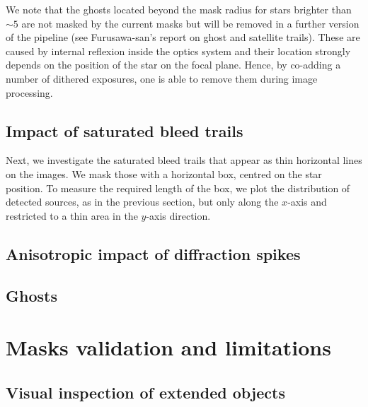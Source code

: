 \documentclass[11pt,a4paper,oneside,final]{scrartcl}
\begin{document}
We note that the ghosts located beyond the mask radius for stars brighter than $\sim5$ are not masked by the current masks but will be removed in a further version of the pipeline (see Furusawa-san's report on ghost and satellite trails). These are caused by internal reflexion inside the optics system and their location strongly depends on the position of the star on the focal plane. Hence, by co-adding a number of dithered exposures, one is able to remove them during image processing.


\subsection{Impact of saturated bleed trails}

Next, we investigate the saturated bleed trails that appear as thin horizontal lines on the images. We mask those with a horizontal box, centred on the star position. To measure the required length of the box, we plot the distribution of detected sources, as in the previous section, but only along the $x$-axis and restricted to a thin area in the $y$-axis direction. %

\subsection{Anisotropic impact of diffraction spikes}

\subsection{Ghosts}




\section{Masks validation and limitations}
\label{sec:valid}

\subsection{Visual inspection of extended objects}
\end{document}
